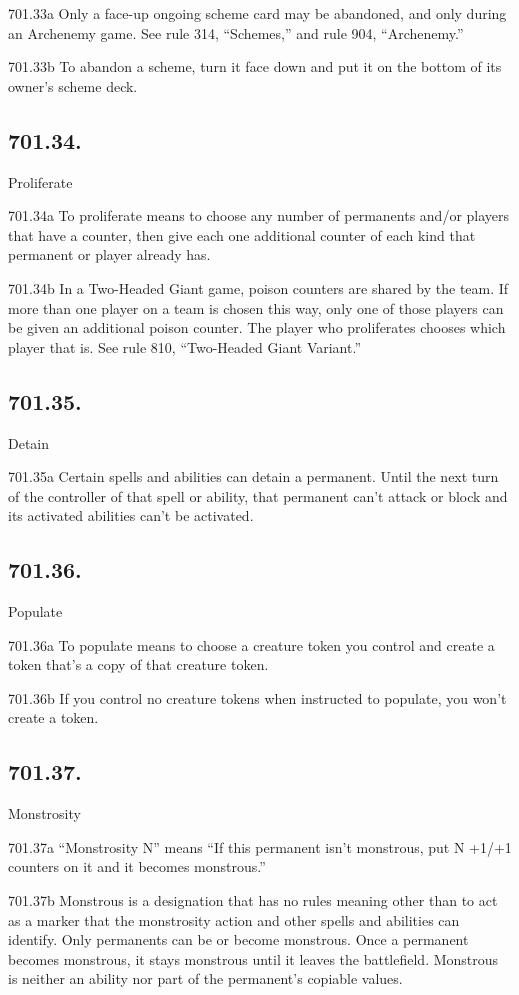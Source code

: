 701.33a Only a face-up ongoing scheme card may be abandoned, and only during an Archenemy game. See rule 314, “Schemes,” and rule 904, “Archenemy.”

701.33b To abandon a scheme, turn it face down and put it on the bottom of its owner’s scheme deck.

\subsection*{701.34.}
Proliferate

701.34a To proliferate means to choose any number of permanents and/or players that have a counter, then give each one additional counter of each kind that permanent or player already has.

701.34b In a Two-Headed Giant game, poison counters are shared by the team. If more than one player on a team is chosen this way, only one of those players can be given an additional poison counter. The player who proliferates chooses which player that is. See rule 810, “Two-Headed Giant Variant.”

\subsection*{701.35.}
Detain

701.35a Certain spells and abilities can detain a permanent. Until the next turn of the controller of that spell or ability, that permanent can’t attack or block and its activated abilities can’t be activated.

\subsection*{701.36.}
Populate

701.36a To populate means to choose a creature token you control and create a token that’s a copy of that creature token.

701.36b If you control no creature tokens when instructed to populate, you won’t create a token.

\subsection*{701.37.}
Monstrosity

701.37a “Monstrosity N” means “If this permanent isn’t monstrous, put N +1/+1 counters on it and it becomes monstrous.”

701.37b Monstrous is a designation that has no rules meaning other than to act as a marker that the monstrosity action and other spells and abilities can identify. Only permanents can be or become monstrous. Once a permanent becomes monstrous, it stays monstrous until it leaves the battlefield. Monstrous is neither an ability nor part of the permanent’s copiable values.


